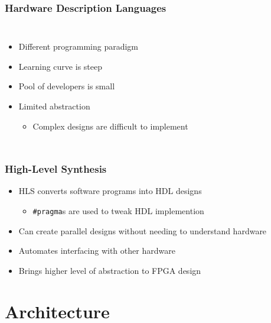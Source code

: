 \documentclass{beamer}
\begin{document}
\begin{frame}
	\frametitle{Hardware Description Languages}
	\begin{columns}
		\begin{itemize}
			\item Different programming paradigm
			\item Learning curve is steep
			\item Pool of developers is small
			\item Limited abstraction
			\begin{itemize}
				\item Complex designs are difficult to implement
				\autocite{honeycomb}
			\end{itemize}
		\end{itemize}
		
		
	\end{columns}
\end{frame}


\begin{frame}
	\frametitle{High-Level Synthesis}
	\begin{itemize}
		\item HLS converts software programs into HDL designs
		\begin{itemize}
			\item \texttt{\#pragma}s are used to tweak HDL implemention
		\end{itemize}
		\item Can create parallel designs without needing to understand hardware
		\item Automates interfacing with other hardware
		\item Brings higher level of abstraction to FPGA design
	\end{itemize}

	
\end{frame}


\section{Architecture}
\end{document}
